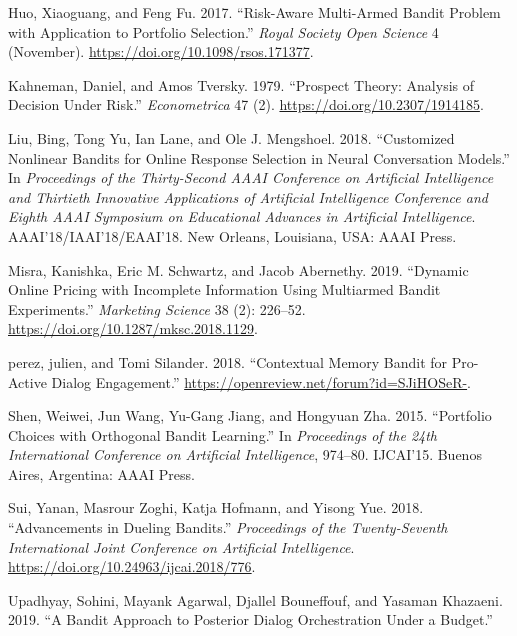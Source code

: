 \documentclass[
  letterpaper,
  numbers=noenddot,
  DIV=11]{scrreprt}
\newlength{\cslhangindent}
\newenvironment{CSLReferences}[2] %
 {\begin{list}{}{%
  \setlength{\itemindent}{0pt}
  \setlength{\leftmargin}{0pt}
  \setlength{\parsep}{0pt}
  \ifodd #1
   \setlength{\leftmargin}{\cslhangindent}
   \setlength{\itemindent}{-1\cslhangindent}
  \fi
  \setlength{\itemsep}{#2\baselineskip}}}
 {\end{list}}
\theoremstyle{definition}
\theoremstyle{plain}
\theoremstyle{plain}
\theoremstyle{remark}
\begin{document}
\begin{CSLReferences}{1}{0}
Huo, Xiaoguang, and Feng Fu. 2017. {``Risk-Aware Multi-Armed Bandit
Problem with Application to Portfolio Selection.''} \emph{Royal Society
Open Science} 4 (November). \url{https://doi.org/10.1098/rsos.171377}.

Kahneman, Daniel, and Amos Tversky. 1979. {``Prospect Theory: Analysis
of Decision Under Risk.''} \emph{Econometrica} 47 (2).
\url{https://doi.org/10.2307/1914185}.

Liu, Bing, Tong Yu, Ian Lane, and Ole J. Mengshoel. 2018. {``Customized
Nonlinear Bandits for Online Response Selection in Neural Conversation
Models.''} In \emph{Proceedings of the Thirty-Second AAAI Conference on
Artificial Intelligence and Thirtieth Innovative Applications of
Artificial Intelligence Conference and Eighth AAAI Symposium on
Educational Advances in Artificial Intelligence}.
AAAI'18/IAAI'18/EAAI'18. New Orleans, Louisiana, USA: AAAI Press.

Misra, Kanishka, Eric M. Schwartz, and Jacob Abernethy. 2019. {``Dynamic
Online Pricing with Incomplete Information Using Multiarmed Bandit
Experiments.''} \emph{Marketing Science} 38 (2): 226--52.
\url{https://doi.org/10.1287/mksc.2018.1129}.

perez, julien, and Tomi Silander. 2018. {``Contextual Memory Bandit for
Pro-Active Dialog Engagement.''}
\url{https://openreview.net/forum?id=SJiHOSeR-}.

Shen, Weiwei, Jun Wang, Yu-Gang Jiang, and Hongyuan Zha. 2015.
{``Portfolio Choices with Orthogonal Bandit Learning.''} In
\emph{Proceedings of the 24th International Conference on Artificial
Intelligence}, 974--80. IJCAI'15. Buenos Aires, Argentina: AAAI Press.

Sui, Yanan, Masrour Zoghi, Katja Hofmann, and Yisong Yue. 2018.
{``Advancements in Dueling Bandits.''} \emph{Proceedings of the
Twenty-Seventh International Joint Conference on Artificial
Intelligence}. \url{https://doi.org/10.24963/ijcai.2018/776}.

Upadhyay, Sohini, Mayank Agarwal, Djallel Bouneffouf, and Yasaman
Khazaeni. 2019. {``A Bandit Approach to Posterior Dialog Orchestration
Under a Budget.''}


\end{CSLReferences}
\end{document}
